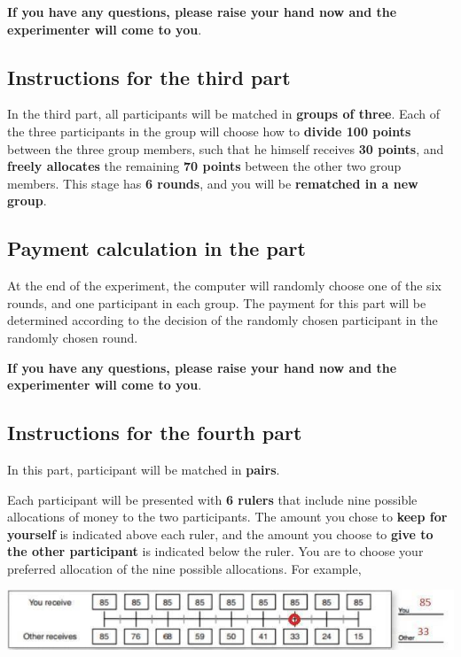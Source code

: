 \textbf{If you have any questions, please raise your hand now and the experimenter will come to you}.

\newpage

\subsection*{Instructions for the third part}

In the third part, all participants will be matched in \textbf{groups of three}. Each of the three participants in the group will choose how to \textbf{divide 100 points} between the three group members, such that he himself receives \textbf{30 points}, and \textbf{freely allocates} the remaining \textbf{70 points} between the other two group members. This stage has \textbf{6 rounds}, and you will be \textbf{rematched in a new group}.

\subsection*{Payment calculation in the part}

At the end of the experiment, the computer will randomly choose one of the six rounds, and one participant in each group. The payment for this part will be determined according to the decision of the randomly chosen participant in the randomly chosen round.

\textbf{If you have any questions, please raise your hand now and the experimenter will come to you}.

\newpage

\subsection*{Instructions for the fourth part}

In this part, participant will be matched in \textbf{pairs}. 

Each participant will be presented with \textbf{6 rulers} that include nine possible allocations of money to the two participants. The amount you chose to \textbf{keep for yourself} is indicated above each ruler, and the amount you choose to \textbf{give to the other participant} is indicated below the ruler. You are to choose your preferred allocation of the nine possible allocations. For example, 
\smallskip

\begin{center}
	\includegraphics[]{svo.png}
\end{center}

